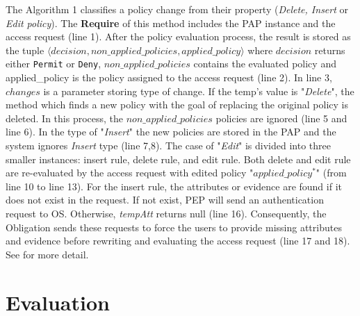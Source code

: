 \documentclass[conference]{IEEEtran}
\begin{document}
The Algorithm 1 classifies a policy change from their property (\textit{Delete, Insert} or \textit{Edit policy}). 
The \textbf{Require} of this method includes the PAP instance and the access request (line 1).
After the policy evaluation process, the result is stored as the tuple $\langle decision, non\_applied\_policies, applied\_policy \rangle$ where $decision$ returns either \texttt{Permit} or \texttt{Deny}, $non\_applied\_policies$ contains the evaluated policy and applied\_policy is the policy assigned to the access request (line 2).
In line 3, $changes$ is a parameter storing type of change. 
If the temp's value is "\textit{Delete}", the method which finds a new policy with the goal of replacing the original policy is deleted.
In this process, the $non\_applied\_policies$ policies are ignored (line 5 and line 6). 
In the type of "\textit{Insert}" the new policies are stored in the PAP and the system ignores \textit{Insert} type (line 7,8).
The case of "\textit{Edit}" is divided into three smaller instances: insert rule, delete rule, and edit rule. 
Both delete and edit rule are re-evaluated by the access request with edited policy "$applied\_policy^*$" (from line 10 to line 13).
For the insert rule, the attributes or evidence are found if it does not exist in the request.
If not exist, PEP will send an authentication request to OS. Otherwise, \textit{tempAtt} returns null (line 16). 
Consequently, the Obligation sends these requests to force the users to provide missing attributes and evidence before rewriting and evaluating the access request (line 17 and 18). 
See \cite{son2017rew} for more detail.

\section{Evaluation}\label{sec:eva}

\end{document}
